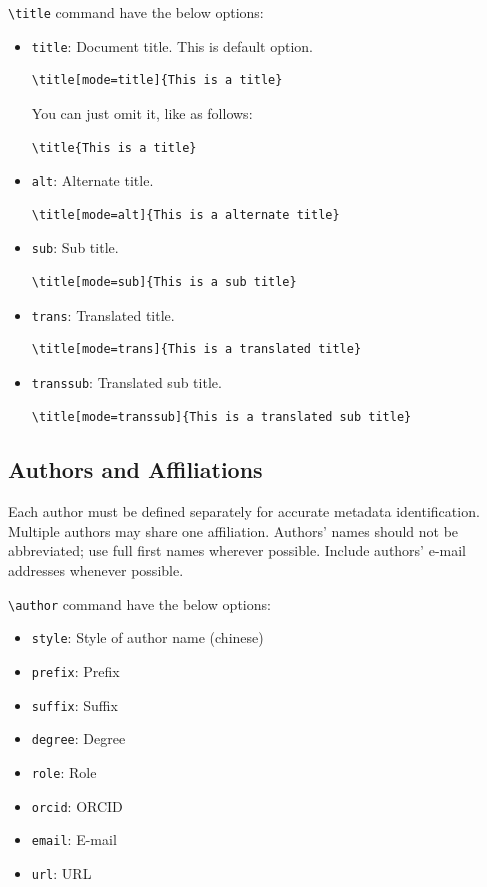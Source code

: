 \documentclass[
]{ceurart}
\begin{document}
\verb|\title| command have the below options:
\begin{itemize}
\item \verb|title|: Document title. This is default option. 
\begin{verbatim}
\title[mode=title]{This is a title}
\end{verbatim}
You can just omit it, like as follows:
\begin{verbatim}
\title{This is a title}
\end{verbatim}

\item \verb|alt|: Alternate title.
\begin{verbatim}
\title[mode=alt]{This is a alternate title}
\end{verbatim}

\item \verb|sub|: Sub title.
\begin{verbatim}
\title[mode=sub]{This is a sub title}
\end{verbatim}

\item \verb|trans|: Translated title.
\begin{verbatim}
\title[mode=trans]{This is a translated title}
\end{verbatim}

\item \verb|transsub|: Translated sub title.
\begin{verbatim}
\title[mode=transsub]{This is a translated sub title}
\end{verbatim}
\end{itemize}

\subsection{Authors and Affiliations}

Each author must be defined separately for accurate metadata
identification. Multiple authors may share one affiliation. Authors'
names should not be abbreviated; use full first names wherever
possible. Include authors' e-mail addresses whenever possible.

\verb|\author| command have the below options: 

\begin{itemize}
\item \verb|style|: Style of author name (chinese)
\item \verb|prefix|: Prefix
\item \verb|suffix|: Suffix
\item \verb|degree|: Degree
\item \verb|role|: Role
\item \verb|orcid|: ORCID
\item \verb|email|: E-mail
\item \verb|url|: URL
\end{itemize}
\end{document}
